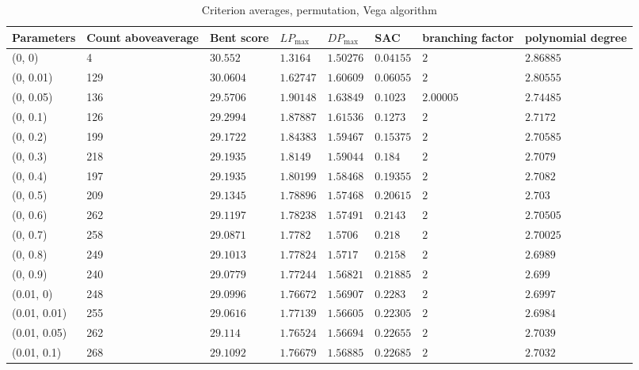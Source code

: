 \begin{center}
{\begin{longtable}{| l | p{} |  p{} | p{} | p{} | p{} | p{} | p{} |}
\caption[ble]{Criterion averages, permutation, Vega algorithm}\label{tabVegaParameters}\\
\hline
Parameters & Count above\-average  & Bent score & $LP_{\max}$ & $DP_{\max}$ & SAC & branching factor & polynomial degree \\ \hline
\endhead
 (0, 0) & 4  & $30.552$ & $1.3164$ & $1.50276$ & $0.04155$ & $2$ & $2.86885$ \\ \hline
 (0, 0.01) & 129  & $30.0604$ & $1.62747$ & $1.60609$ & $0.06055$ & $2$ & $2.80555$ \\ \hline
 (0, 0.05) & 136  & $29.5706$ & $1.90148$ & $1.63849$ & $0.1023$ & $2.00005$ & $2.74485$ \\ \hline
 (0, 0.1) & 126  & $29.2994$ & $1.87887$ & $1.61536$ & $0.1273$ & $2$ & $2.7172$ \\ \hline
 (0, 0.2) & 199  & $29.1722$ & $1.84383$ & $1.59467$ & $0.15375$ & $2$ & $2.70585$ \\ \hline
 (0, 0.3) & 218  & $29.1935$ & $1.8149$ & $1.59044$ & $0.184$ & $2$ & $2.7079$ \\ \hline
 (0, 0.4) & 197  & $29.1935$ & $1.80199$ & $1.58468$ & $0.19355$ & $2$ & $2.7082$ \\ \hline
 (0, 0.5) & 209  & $29.1345$ & $1.78896$ & $1.57468$ & $0.20615$ & $2$ & $2.703$ \\ \hline
 (0, 0.6) & 262  & $29.1197$ & $1.78238$ & $1.57491$ & $0.2143$ & $2$ & $2.70505$ \\ \hline
 (0, 0.7) & 258  & $29.0871$ & $1.7782$ & $1.5706$ & $0.218$ & $2$ & $2.70025$ \\ \hline
 (0, 0.8) & 249  & $29.1013$ & $1.77824$ & $1.5717$ & $0.2158$ & $2$ & $2.6989$ \\ \hline
 (0, 0.9) & 240  & $29.0779$ & $1.77244$ & $1.56821$ & $0.21885$ & $2$ & $2.699$ \\ \hline
 (0.01, 0) & 248  & $29.0996$ & $1.76672$ & $1.56907$ & $0.2283$ & $2$ & $2.6997$ \\ \hline
 (0.01, 0.01) & 255  & $29.0616$ & $1.77139$ & $1.56605$ & $0.22305$ & $2$ & $2.6984$ \\ \hline
 (0.01, 0.05) & 262  & $29.114$ & $1.76524$ & $1.56694$ & $0.22655$ & $2$ & $2.7039$ \\ \hline
 (0.01, 0.1) & 268  & $29.1092$ & $1.76679$ & $1.56885$ & $0.22685$ & $2$ & $2.7032$ \\ \hline

\end{longtable}}
\end{center}
